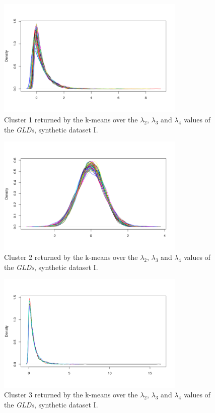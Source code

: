 \begin{figure}[H]
    \centering
    \includegraphics[width=0.8\textwidth]{img/gld_clustering/Dataset1/l2_l3_l4/intento_3/cluster1.png}
    \caption{Cluster 1 returned by the k-means over the $\lambda_{2}$, $\lambda_{3}$ and $\lambda_{4}$ values of the \textit{GLDs}, synthetic dataset I.}
    \label{fig:dataset1_l2l3l4_cl1}
\end{figure}

\begin{figure}[H]
    \centering
    \includegraphics[width=0.8\textwidth]{img/gld_clustering/Dataset1/l2_l3_l4/cluster4.png}
    \caption{Cluster 2 returned by the k-means over the $\lambda_{2}$, $\lambda_{3}$ and $\lambda_{4}$ values of the \textit{GLDs}, synthetic dataset I.}
    \label{fig:dataset1_l2l3l4_cl2}
\end{figure}

\begin{figure}[H]
    \centering
    \includegraphics[width=0.8\textwidth]{img/gld_clustering/Dataset1/l2_l3_l4/intento_3/cluster3.png}
    \caption{Cluster 3 returned by the k-means over the $\lambda_{2}$, $\lambda_{3}$ and $\lambda_{4}$ values of the \textit{GLDs}, synthetic dataset I.}
    \label{fig:dataset1_l2l3l4_cl3}
\end{figure}

